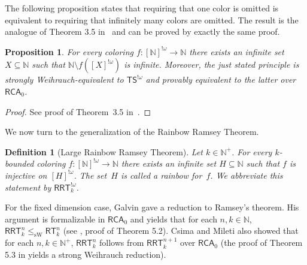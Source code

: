 \documentclass[10pt,a4paper]{article}
\newcommand{\RCA}[0]{\mathsf{RCA}}
\newcommand{\RRT}[0]{\mathsf{RRT}}
\newcommand{\TS}[0]{\mathsf{TS}}
\newcommand{\RT}[0]{\mathsf{RT}}
\newcommand{\NN}[0]{\mathbb{N}}
\newcommand{\sW}{\mathrm{sW}}
\numberwithin{theorem}{section}
\newtheorem{proposition}[theorem]{Proposition}
\newtheorem{definition}[theorem]{Definition}
\begin{document}

The following proposition states that requiring that one color is omitted is equivalent to requiring that infinitely many colors are omitted. The result is the analogue of Theorem 3.5 in~\cite{Cholak_Giusto_Hirst_Jockusch_2005} and can be proved by exactly the same proof.

\begin{proposition}
    For every coloring $f:[\NN]^{!\omega} \to \NN$ there exists an infinite set $X\subseteq\NN$ such that $\NN\setminus f([X]^{!\omega})$ is infinite. Moreover, the just stated principle is strongly Weihrauch-equivalent to $\TS^{!\omega}$ and provably equivalent to the latter over $\RCA_0$.
\end{proposition}

\begin{proof}
See proof of Theorem~3.5 in~\cite{Cholak_Giusto_Hirst_Jockusch_2005}.

\end{proof}

We now turn to the generalization of the Rainbow Ramsey Theorem. 

\begin{definition}[Large Rainbow Ramsey Theorem]
Let $k\in \NN^+$. For every $k$-bounded coloring $f:[\NN]^{!\omega} \to \NN$ there exists an infinite set $H\subseteq \NN$ such that $f$ is injective on $[H]^{!\omega}$. The set~$H$ is called a \emph{rainbow} for~$f$. We abbreviate this statement by $\RRT^{!\omega}_k$.
\end{definition}

For the fixed dimension case, Galvin gave a reduction to Ramsey's theorem. His argument is formalizable in $\RCA_0$ and yields that for each $n, k\in\NN$, $\RRT^n_k \leq_\sW \RT^n_k$ (see \cite{CsimaMileti_2009}, proof of Theorem 5.2). Csima and Mileti also showed that for each $n,k\in\NN^+$, $\RRT^n_k$ follows from $\RRT^{n+1}_k$ over $\RCA_0$ (the proof of Theorem 5.3 in \cite{CsimaMileti_2009} yields a strong Weihrauch reduction).%
\end{document}

